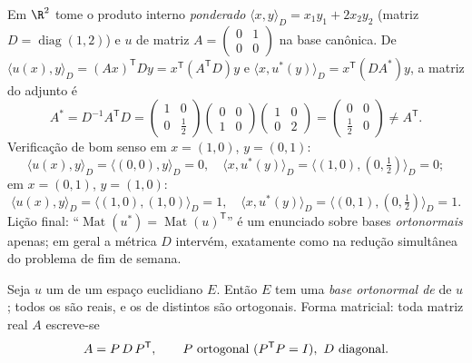 \begin{example}\label{ex:b2:quadratic:weightedadjoint}
Em $\R^2$ tome o produto interno \emph{ponderado} $\langle x,
y\rangle_D = x_1y_1 + 2x_2y_2$ (matriz $D =
\operatorname{diag}(1,2)$) e $u$ de matriz $A =
\begin{pmatrix} 0 & 1\\ 0 & 0\end{pmatrix}$ na base
canônica. De $\langle u(x), y\rangle_D = (Ax)^{\mathsf T}Dy =
x^{\mathsf T}(A^{\mathsf T}D)y$ e $\langle x, u^*(y)\rangle_D
= x^{\mathsf T}(DA^*)y$, a matriz do adjunto é
\[
A^* = D^{-1}A^{\mathsf T}D
= \begin{pmatrix} 1 & 0\\ 0 & \tfrac12\end{pmatrix}
\begin{pmatrix} 0 & 0\\ 1 & 0\end{pmatrix}
\begin{pmatrix} 1 & 0\\ 0 & 2\end{pmatrix}
= \begin{pmatrix} 0 & 0\\ \tfrac12 & 0\end{pmatrix}
\neq A^{\mathsf T} .
\]
Verificação de bom senso em $x = (1,0)$, $y = (0,1)$:
\[
\langle u(x), y\rangle_D = \langle (0,0), y\rangle_D = 0,
\quad
\langle x, u^*(y)\rangle_D
= \langle(1,0), (0,\tfrac12)\rangle_D = 0 ;
\]
em $x = (0,1)$, $y = (1,0)$:
\[
\langle u(x), y\rangle_D = \langle(1,0),(1,0)\rangle_D = 1,
\quad
\langle x, u^*(y)\rangle_D =
\langle(0,1),(0,\tfrac12)\rangle_D = 1 .
\] Lição final: ``$\operatorname{Mat}(u^*)
= \operatorname{Mat}(u)^{\mathsf T}$'' é um enunciado sobre
bases \emph{ortonormais} apenas; em geral a métrica $D$
intervém, exatamente como na redução simultânea do
problema de fim de semana.
\end{example}

\begin{theorem}\label{thm:b2:quadratic:spectral}
Seja $u$ um  de um espaço euclidiano $E$. Então
$E$ tem uma \emph{base ortonormal de } de $u$; todos os
 são reais, e os  de  distintos são
ortogonais. Forma matricial: toda matriz real  $A$ escreve-se
\[
A = P\,D\,P^{\mathsf T},
\qquad P \text{ ortogonal } (P^{\mathsf T} P = I),\ D
\text{ diagonal}.\index{teorema espectral}
\]
\end{theorem}

